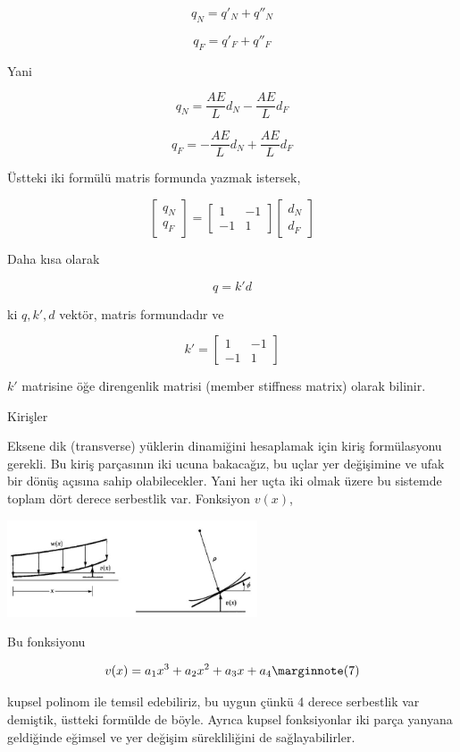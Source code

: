 \documentclass[12pt,fleqn]{article}\usepackage{../../common}
\begin{document}
$$
q_N = q'_N + q''_N 
$$

$$
q_F = q'_F + q''_F
$$

Yani

$$
q_N = \frac{AE}{L} d_N - \frac{AE}{L} d_F
$$

$$
q_F = -\frac{AE}{L} d_N + \frac{AE}{L} d_F
$$

Üstteki iki formülü matris formunda yazmak istersek,

$$
\left[\begin{array}{c}
q_N \\ q_F
\end{array}\right] =
\left[\begin{array}{cc}
1 & -1 \\ -1 & 1
\end{array}\right]
\left[\begin{array}{c}
d_N \\ d_F
\end{array}\right] 
$$

Daha kısa olarak

$$
q = k' d
$$

ki $q,k',d$ vektör, matris formundadır ve

$$
k' = \left[\begin{array}{cc}
1 & -1 \\ -1 & 1
\end{array}\right]
$$

$k'$ matrisine öğe direngenlik matrisi (member stiffness matrix) olarak bilinir.

Kirişler

Eksene dik (transverse) yüklerin dinamiğini hesaplamak için kiriş formülasyonu
gerekli. Bu kiriş parçasının iki ucuna bakacağız, bu uçlar yer değişimine ve
ufak bir dönüş açısına sahip olabilecekler. Yani her uçta iki olmak üzere
bu sistemde toplam dört derece serbestlik var. Fonksiyon $v(x)$,

\includegraphics[width=20em]{phy_020_strs_05_09.jpg}

Bu fonksiyonu

$$
v(x) = a_1 x^3 + a_2 x^2 + a_3 x + a_4
\mlabel{7}
$$

kupsel polinom ile temsil edebiliriz, bu uygun çünkü 4 derece serbestlik var
demiştik, üstteki formülde de böyle. Ayrıca kupsel fonksiyonlar iki parça
yanyana geldiğinde eğimsel ve yer değişim sürekliliğini de sağlayabilirler.
\end{document}
